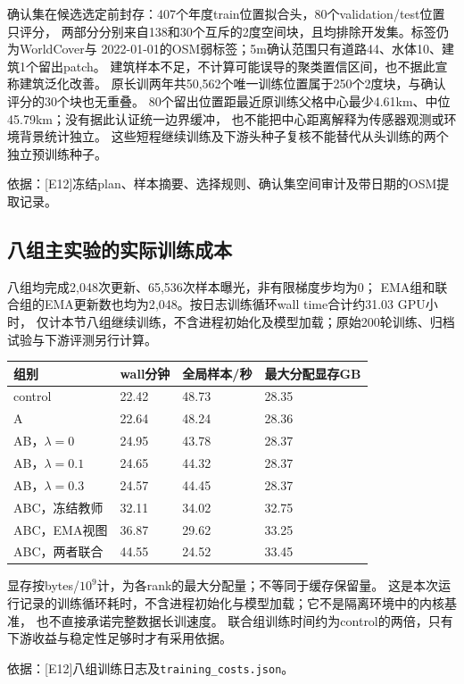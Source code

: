 \documentclass[UTF8,fontset=fandol,zihao=5,a4paper]{ctexart}
\newcommand{\source}[1]{\par{\footnotesize\color{muted}依据：#1}\par}
\begin{document}
确认集在候选选定前封存：407个年度train位置拟合头，80个validation/test位置只评分，
两部分分别来自138和30个互斥的2度空间块，且均排除开发集。标签仍为WorldCover与
2022-01-01的OSM弱标签；5m确认范围只有道路44、水体10、建筑1个留出patch。
建筑样本不足，不计算可能误导的聚类置信区间，也不据此宣称建筑泛化改善。
原长训两年共50{,}562个唯一训练位置属于250个2度块，与确认评分的30个块也无重叠。
80个留出位置距最近原训练父格中心最少4.61km、中位45.79km；没有据此认证统一边界缓冲，
也不能把中心距离解释为传感器观测或环境背景统计独立。
这些短程继续训练及下游头种子复核不能替代从头训练的两个独立预训练种子。
\source{[E12]冻结plan、样本摘要、选择规则、确认集空间审计及带日期的OSM提取记录。}

\subsection{八组主实验的实际训练成本}
八组均完成2{,}048次更新、65{,}536次样本曝光，非有限梯度步均为0；
EMA组和联合组的EMA更新数也均为2{,}048。按日志训练循环wall time合计约31.03 GPU小时，
仅计本节八组继续训练，不含进程初始化及模型加载；原始200轮训练、归档试验与下游评测另行计算。

\noindent\begin{tabularx}{\linewidth}{@{}p{4cm}YYY@{}}
\toprule 组别 & wall分钟 & 全局样本/秒 & 最大分配显存GB\\\midrule
control & 22.42 & 48.73 & 28.35\\
A & 22.64 & 48.24 & 28.36\\
AB，$\lambda=0$ & 24.95 & 43.78 & 28.37\\
AB，$\lambda=0.1$ & 24.65 & 44.32 & 28.37\\
AB，$\lambda=0.3$ & 24.57 & 44.45 & 28.37\\
ABC，冻结教师 & 32.11 & 34.02 & 32.75\\
ABC，EMA视图 & 36.87 & 29.62 & 33.25\\
ABC，两者联合 & 44.55 & 24.52 & 33.45\\\bottomrule
\end{tabularx}

显存按bytes/$10^9$计，为各rank的最大分配量；不等同于缓存保留量。
这是本次运行记录的训练循环耗时，不含进程初始化与模型加载；它不是隔离环境中的内核基准，
也不直接承诺完整数据长训速度。
联合组训练时间约为control的两倍，只有下游收益与稳定性足够时才有采用依据。
\source{[E12]八组训练日志及\texttt{training\_costs.json}。}
\end{document}
